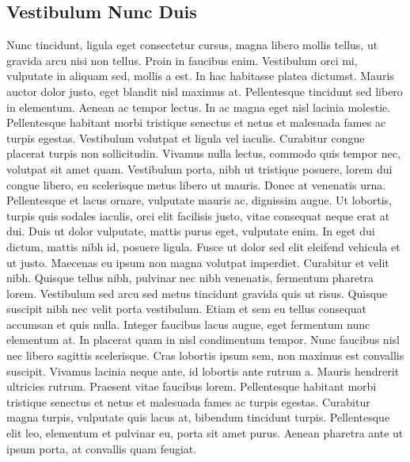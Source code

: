 \documentclass[10pt]{../bil-CV}
\begin{document}
\subsectionrule

\subsection{Vestibulum Nunc Duis}

Nunc tincidunt, ligula eget consectetur cursus, magna libero mollis tellus, ut gravida arcu nisi non tellus. Proin in faucibus enim. Vestibulum orci mi, vulputate in aliquam sed, mollis a est. In hac habitasse platea dictumst. Mauris auctor dolor justo, eget blandit nisl maximus at. Pellentesque tincidunt sed libero in elementum. Aenean ac tempor lectus. In ac magna eget nisl lacinia molestie. Pellentesque habitant morbi tristique senectus et netus et malesuada fames ac turpis egestas.
\littleblankline
Vestibulum volutpat et ligula vel iaculis. Curabitur congue placerat turpis non sollicitudin. Vivamus nulla lectus, commodo quis tempor nec, volutpat sit amet quam. Vestibulum porta, nibh ut tristique posuere, lorem dui congue libero, eu scelerisque metus libero ut mauris. Donec at venenatis urna. Pellentesque et lacus ornare, vulputate mauris ac, dignissim augue. Ut lobortis, turpis quis sodales iaculis, orci elit facilisis justo, vitae consequat neque erat at dui.
\littleblankline
Duis ut dolor vulputate, mattis purus eget, vulputate enim. In eget dui dictum, mattis nibh id, posuere ligula. Fusce ut dolor sed elit eleifend vehicula et ut justo. Maecenas eu ipsum non magna volutpat imperdiet.
\littleblankline
Curabitur et velit nibh. Quisque tellus nibh, pulvinar nec nibh venenatis, fermentum pharetra lorem. Vestibulum sed arcu sed metus tincidunt gravida quis ut risus. Quisque suscipit nibh nec velit porta vestibulum. Etiam et sem eu tellus consequat accumsan et quis nulla. Integer faucibus lacus augue, eget fermentum nunc elementum at. In placerat quam in nisl condimentum tempor. Nunc faucibus nisl nec libero sagittis scelerisque.
 \littleblankline
Cras lobortis ipsum sem, non maximus est convallis suscipit. Vivamus lacinia neque ante, id lobortis ante rutrum a. Mauris hendrerit ultricies rutrum. Praesent vitae faucibus lorem. Pellentesque habitant morbi tristique senectus et netus et malesuada fames ac turpis egestas. Curabitur magna turpis, vulputate quis lacus at, bibendum tincidunt turpis. Pellentesque elit leo, elementum et pulvinar eu, porta sit amet purus. Aenean pharetra ante ut ipsum porta, at convallis quam feugiat. 

\end{document}

